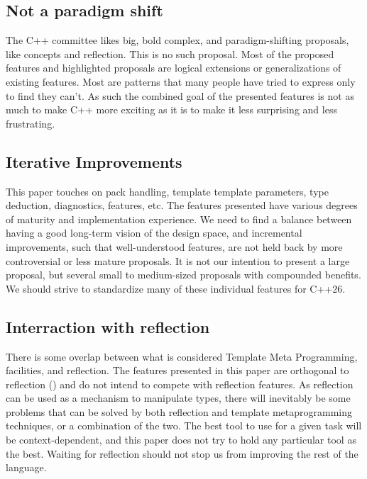 \documentclass{wg21}
\begin{document}
\subsection{Not a paradigm shift}

The C++ committee likes big, bold complex, and paradigm-shifting proposals, like concepts and reflection.
This is no such proposal.
Most of the proposed features and highlighted proposals are logical extensions or generalizations of existing features.
Most are patterns that many people have tried to express only to find they can't.
As such the combined goal of the presented features is not as much to make C++ more exciting as it is to make it less surprising and less frustrating.

\subsection{Iterative Improvements}

This paper touches on pack handling, template template parameters, type deduction, diagnostics,  features, etc.
The features presented have various degrees of maturity and implementation experience.
We need to find a balance between having a good long-term vision of the design space, and incremental improvements, such that well-understood features,
are not held back by more controversial or less mature proposals.
It is not our intention to present a large proposal, but several small to medium-sized proposals with compounded benefits.
We should strive to standardize many of these individual features for C++26.

\subsection{Interraction with reflection}

There is some overlap between what is considered Template Meta Programming,  facilities, and reflection.
The features presented in this paper are orthogonal to reflection () and do not intend to compete with reflection features.
As reflection can be used as a mechanism to manipulate types, there will inevitably be some problems that can be solved by both reflection
and template metaprogramming techniques, or a combination of the two. The best tool to use for a given task will be context-dependent,
and this paper does not try to hold any particular tool as the best.
Waiting for reflection should not stop us from improving the rest of the language.
\end{document}
